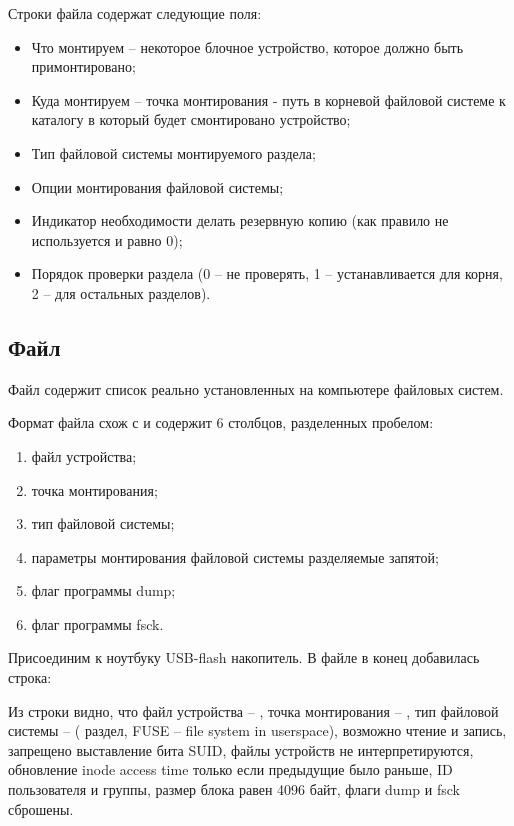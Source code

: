 Строки файла содержат следующие поля:
\begin{itemize}
	\item Что монтируем -- некоторое блочное устройство, которое должно быть примонтировано;
	\item Куда монтируем -- точка монтирования - путь в корневой файловой системе к каталогу в который будет смонтировано устройство;
	\item Тип файловой системы монтируемого раздела;
	\item Опции монтирования файловой системы;
	\item Индикатор необходимости делать резервную копию (как правило не используется и равно 0);
	\item Порядок проверки раздела (0 -- не проверять, 1 -- устанавливается для корня, 2 -- для остальных разделов).
\end{itemize}

\subsection{Файл }

Файл  содержит список реально установленных на компьютере файловых систем.


Формат файла схож с  и содержит 6 столбцов, разделенных пробелом:
\begin{enumerate}
	\item файл устройства;
	\item точка монтирования;
	\item тип файловой системы;
	\item параметры монтирования файловой системы разделяемые запятой;
	\item флаг программы dump;
	\item флаг программы fsck.
\end{enumerate}

Присоединим к ноутбуку USB-flash накопитель. В файле  в конец добавилась строка:


Из строки видно, что файл устройства -- , точка монтирования -- , тип файловой системы --  ( раздел, FUSE -- file system in userspace), возможно чтение и запись, запрещено выставление бита SUID, файлы устройств не интерпретируются, обновление inode access time только если предыдущие было раньше, ID пользователя и группы, размер блока равен 4096 байт, флаги dump и fsck сброшены.

